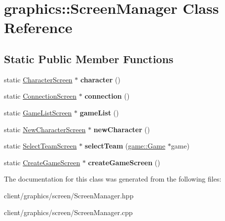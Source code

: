 \hypertarget{classgraphics_1_1_screen_manager}{\section{graphics\-:\-:Screen\-Manager Class Reference}
\label{classgraphics_1_1_screen_manager}
}
\subsection*{Static Public Member Functions}
\begin{DoxyCompactItemize}
\item 
\hypertarget{classgraphics_1_1_screen_manager_af9c401aeb9291d22e197ebad9dfa1c04}{static \hyperlink{classgraphics_1_1_character_screen}{Character\-Screen} $\ast$ {\bfseries character} ()}\label{classgraphics_1_1_screen_manager_af9c401aeb9291d22e197ebad9dfa1c04}

\item 
\hypertarget{classgraphics_1_1_screen_manager_a246aea0d5cbba6c0da22fffda1361ab3}{static \hyperlink{classgraphics_1_1_connection_screen}{Connection\-Screen} $\ast$ {\bfseries connection} ()}\label{classgraphics_1_1_screen_manager_a246aea0d5cbba6c0da22fffda1361ab3}

\item 
\hypertarget{classgraphics_1_1_screen_manager_a099f0905fa0c7071846c32f6543bea53}{static \hyperlink{classgraphics_1_1_game_list_screen}{Game\-List\-Screen} $\ast$ {\bfseries game\-List} ()}\label{classgraphics_1_1_screen_manager_a099f0905fa0c7071846c32f6543bea53}

\item 
\hypertarget{classgraphics_1_1_screen_manager_a7b2712dccd7249af75f23ce6488cf933}{static \hyperlink{classgraphics_1_1_new_character_screen}{New\-Character\-Screen} $\ast$ {\bfseries new\-Character} ()}\label{classgraphics_1_1_screen_manager_a7b2712dccd7249af75f23ce6488cf933}

\item 
\hypertarget{classgraphics_1_1_screen_manager_ade343a252689a8d19c425196bcdf838d}{static \hyperlink{classgraphics_1_1_select_team_screen}{Select\-Team\-Screen} $\ast$ {\bfseries select\-Team} (\hyperlink{classgame_1_1_game}{game\-::\-Game} $\ast$game)}\label{classgraphics_1_1_screen_manager_ade343a252689a8d19c425196bcdf838d}

\item 
\hypertarget{classgraphics_1_1_screen_manager_a0abb7baf305c5c70828455baf6ca399b}{static \hyperlink{classgraphics_1_1_create_game_screen}{Create\-Game\-Screen} $\ast$ {\bfseries create\-Game\-Screen} ()}\label{classgraphics_1_1_screen_manager_a0abb7baf305c5c70828455baf6ca399b}

\end{DoxyCompactItemize}


The documentation for this class was generated from the following files\-:\begin{DoxyCompactItemize}
\item 
client/graphics/screen/Screen\-Manager.\-hpp\item 
client/graphics/screen/Screen\-Manager.\-cpp\end{DoxyCompactItemize}
